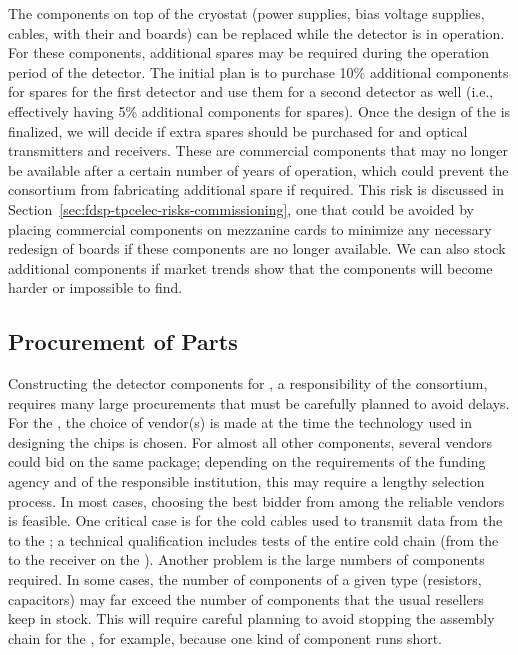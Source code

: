 The components on top of the cryostat (power supplies, bias
voltage supplies, cables,  with their 
and  boards) can be replaced while the
detector is in operation. For these components, additional spares may be required
during the \dunelifetime operation period of the  detector.
The initial plan is to purchase 10\% additional components for spares for the first
 detector and use them for a second detector as well
(i.e., effectively having 5\% additional components for spares). Once the design of
the  is finalized, we will decide if 
extra spares should be purchased for  and optical
transmitters and receivers. These are commercial components 
that may no longer be available after a certain number of 
years of operation, which could prevent the  consortium from
fabricating additional spare  if required. This
risk is discussed in Section~\ref{sec:fdsp-tpcelec-risks-commissioning}, one that
could be avoided by placing commercial components
on mezzanine cards to minimize any necessary redesign of
boards if these components are no longer available.
We can also stock additional components
if market trends show that the components will  
become harder or impossible to find.

\subsection{Procurement of Parts}
\label{sec:fdsp-tpcelec-production-procurement}

Constructing the detector components for , a
responsibility of the  consortium, requires many
large procurements that must be carefully planned to avoid
delays. For the , the choice of vendor(s)
is made at the time the technology
used in designing the chips is chosen. For almost all other components,
several vendors could bid on the same 
package; depending on the requirements of the funding
agency and of the responsible institution, this may require a lengthy
selection process. In most cases, choosing
the best bidder from among the reliable vendors is feasible. One critical case
is for the cold cables used to transmit data from the
 to the ; a technical qualification
includes tests of the entire cold chain (from the 
to the receiver on the ). Another 
problem is the large numbers of components
required. In some cases, the number of components of a given
type (resistors, capacitors) may far exceed the number of components
that the usual resellers keep in stock. This will 
require careful planning to avoid stopping the assembly chain for
the , for example, because 
one kind of component runs short.

